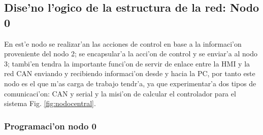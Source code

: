 \subsection{Dise'no l'ogico de la estructura de la red: Nodo 0 }
En est'e nodo se realizar'an las acciones de control en base a la informaci'on proveniente del nodo 2; se encapsular'a la acci'on de control y se enviar'a al nodo 3; tambi'en tendra la importante funci'on de servir de enlace entre la HMI y la red CAN enviando y recibiendo informaci'on desde y hacia la PC, por tanto este nodo es el que m'as carga de trabajo tendr'a, ya que experimentar'a dos tipos de comunicaci'on: CAN y serial y la misi'on de calcular el controlador para el sistema Fig. \ref{fig:nodocentral}.

\subsubsection{Programaci'on nodo 0}


